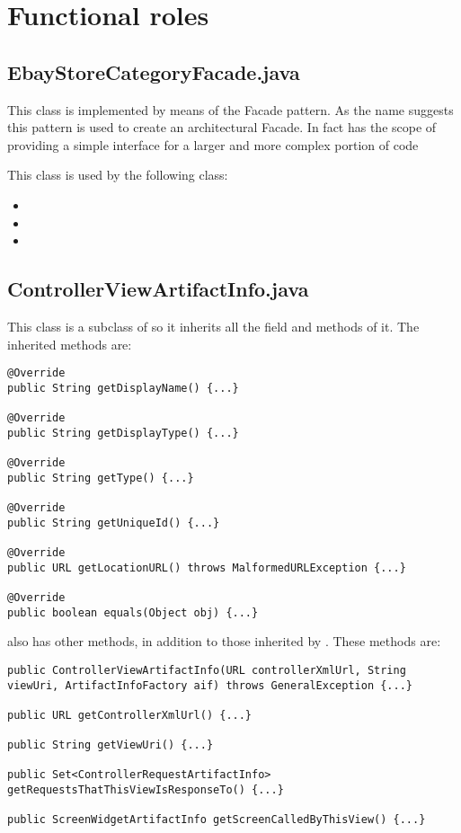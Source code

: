 \chapter{Functional roles}
\section{EbayStoreCategoryFacade.java}
This class is implemented by means of the Facade pattern.
As the name suggests this pattern is used to create an architectural Facade.
In fact  has the scope of providing a simple interface for a larger and more complex portion of code

This class is used by the following class:
\begin{itemize}
\item {}
\item {}
\item {}
\end{itemize}

\section{ControllerViewArtifactInfo.java}

This class is a subclass of  so it inherits all the field and methods of it.
The inherited methods are:
\begin{lstlisting}[numbers=none, caption={Inherited methods by ControllerViewArtifactInfo.java}]
@Override
public String getDisplayName() {...}

@Override
public String getDisplayType() {...}

@Override
public String getType() {...}

@Override
public String getUniqueId() {...}

@Override
public URL getLocationURL() throws MalformedURLException {...}

@Override
public boolean equals(Object obj) {...}
\end{lstlisting}

 also has other methods, in addition to those inherited by .
These methods are:
\begin{lstlisting}[numbers=none, caption={Other methods of ControllerViewArtifactInfo.java}]
public ControllerViewArtifactInfo(URL controllerXmlUrl, String viewUri, ArtifactInfoFactory aif) throws GeneralException {...}

public URL getControllerXmlUrl() {...}

public String getViewUri() {...}

public Set<ControllerRequestArtifactInfo> getRequestsThatThisViewIsResponseTo() {...}

public ScreenWidgetArtifactInfo getScreenCalledByThisView() {...}
\end{lstlisting}

